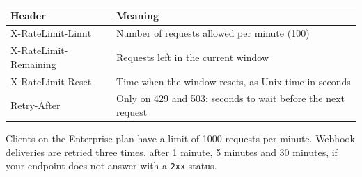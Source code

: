 \documentclass[10pt,a4paper]{article}
\newcommand{\code}[1]{\texttt{#1}}
\begin{document}
\begin{center}
\small
\begin{tabularx}{\linewidth}{@{}>{\ttfamily}l X@{}}
  \toprule
  \textbf{Header} & \textbf{Meaning} \\
  \midrule
  X-RateLimit-Limit & Number of requests allowed per minute (100) \\
  X-RateLimit-Remaining & Requests left in the current window \\
  X-RateLimit-Reset & Time when the window resets, as Unix time in seconds \\
  Retry-After & Only on 429 and 503: seconds to wait before the next request \\
  \bottomrule
\end{tabularx}
\end{center}

Clients on the Enterprise plan have a limit of 1000 requests per minute. Webhook deliveries are retried three times,
after 1 minute, 5 minutes and 30 minutes, if your endpoint does not answer with a \code{2xx} status.
\end{document}
